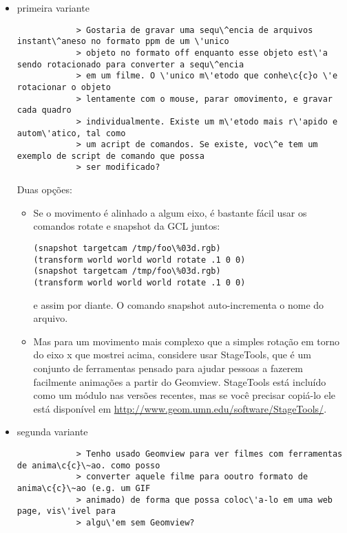 \documentclass[12pt,a4paper]{article}
\begin{document}
        \begin{itemize}

        \item primeira variante 
    	    \tiny
    	    \begin{verbatim}
            > Gostaria de gravar uma sequ\^encia de arquivos instant\^aneso no formato ppm de um \'unico
            > objeto no formato off enquanto esse objeto est\'a sendo rotacionado para converter a sequ\^encia
            > em um filme. O \'unico m\'etodo que conhe\c{c}o \'e rotacionar o objeto
            > lentamente com o mouse, parar omovimento, e gravar cada quadro
            > individualmente. Existe um m\'etodo mais r\'apido e autom\'atico, tal como
            > um acript de comandos. Se existe, voc\^e tem um exemplo de script de comando que possa
            > ser modificado?
	    \end{verbatim}
	    \normalsize
            Duas op\c{c}\~oes:
              \begin{itemize}
              \item Se o movimento \'e alinhado a algum eixo, \'e bastante f\'acil usar os
              comandos rotate e snapshot da GCL juntos:
\begin{verbatim}
(snapshot targetcam /tmp/foo\%03d.rgb)
(transform world world world rotate .1 0 0)
(snapshot targetcam /tmp/foo\%03d.rgb)
(transform world world world rotate .1 0 0)
\end{verbatim}
                e assim por diante. O comando snapshot auto-incrementa o nome do arquivo.

              \item Mas para um movimento mais complexo que a simples rota\c{c}\~ao em torno
                do eixo x que mostrei acima, considere usar StageTools, que
                \'e um conjunto de ferramentas pensado para ajudar pessoas a fazerem facilmente
                anima\c{c}\~oes a partir do Geomview. StageTools est\'a inclu\'ido como um m\'{o}dulo nas
                vers\~oes recentes, mas se voc\^e precisar copi\'a-lo ele est\'a dispon\'ivel
                em  \url{http://www.geom.umn.edu/software/StageTools/}.
              \end{itemize}

        \item segunda variante 
    	    \tiny
	    \begin{verbatim}
            > Tenho usado Geomview para ver filmes com ferramentas de anima\c{c}\~ao. como posso
            > converter aquele filme para ooutro formato de anima\c{c}\~ao (e.g. um GIF
            > animado) de forma que possa coloc\'a-lo em uma web page, vis\'ivel para
            > algu\'em sem Geomview?
	    \end{verbatim}
	    \normalsize
	    

\end{itemize}
\end{document}
